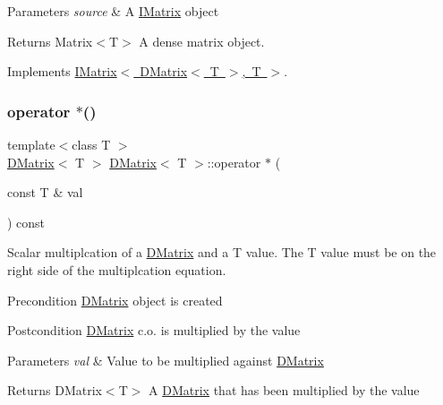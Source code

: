 \begin{DoxyParams}{Parameters}
{\em source} & A \mbox{\hyperlink{class_i_matrix}{I\+Matrix}} object \\
\hline
\end{DoxyParams}
\begin{DoxyReturn}{Returns}
Matrix$<$\+T$>$ A dense matrix object. 
\end{DoxyReturn}


Implements \mbox{\hyperlink{class_i_matrix_aa4d4f7ce2daec7d68ff8fd590652544d}{I\+Matrix$<$ D\+Matrix$<$ T $>$, T $>$}}.

\mbox{\label{class_d_matrix_a75ef39fe66d72426b7a84b91bfc136c4}} 
\subsubsection{\texorpdfstring{operator $\ast$()}{operator *()}}
{\footnotesize\ttfamily template$<$class T $>$ \\
\mbox{\hyperlink{class_d_matrix}{D\+Matrix}}$<$ T $>$ \mbox{\hyperlink{class_d_matrix}{D\+Matrix}}$<$ T $>$\+::operator $\ast$ (\begin{DoxyParamCaption}\item[{const T \&}]{val }\end{DoxyParamCaption}) const\hspace{0.3cm}{\ttfamily [virtual]}}



Scalar multiplcation of a \mbox{\hyperlink{class_d_matrix}{D\+Matrix}} and a T value. The T value must be on the right side of the multiplcation equation. 

\begin{DoxyPrecond}{Precondition}
\mbox{\hyperlink{class_d_matrix}{D\+Matrix}} object is created 
\end{DoxyPrecond}
\begin{DoxyPostcond}{Postcondition}
\mbox{\hyperlink{class_d_matrix}{D\+Matrix}} c.\+o. is multiplied by the value 
\end{DoxyPostcond}

\begin{DoxyParams}{Parameters}
{\em val} & Value to be multiplied against \mbox{\hyperlink{class_d_matrix}{D\+Matrix}} \\
\hline
\end{DoxyParams}
\begin{DoxyReturn}{Returns}
D\+Matrix$<$\+T$>$ A \mbox{\hyperlink{class_d_matrix}{D\+Matrix}} that has been multiplied by the value 
\end{DoxyReturn}


